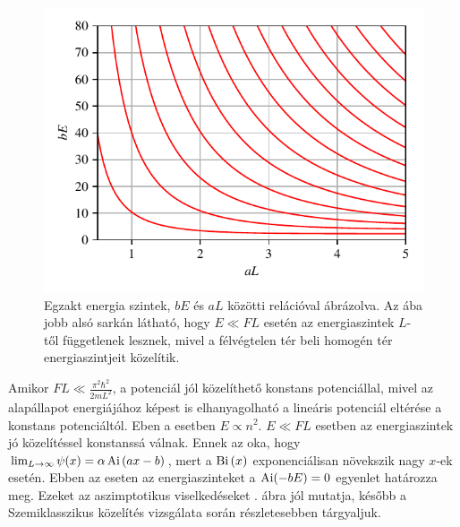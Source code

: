 \begin{figure}[H]
	\centering
	\includegraphics[scale=1]{./figs/energiaszintek.pdf}
	\caption[Egzakt energiaszintek]{Egzakt energia szintek, $bE$ és $aL$ közötti relációval ábrázolva. Az ába jobb alsó sarkán látható, hogy $E \ll FL$ esetén az energiaszintek $L$-től függetlenek lesznek, mivel a félvégtelen tér beli homogén tér energiaszintjeit közelítik.}
	\label{box_energiaszintek_abra}
\end{figure}
Amikor $FL \ll \frac{\pi^2\hbar^2}{2mL^2}$, a potenciál jól közelíthető konstans potenciállal, mivel az alapállapot energiájához képest is elhanyagolható a lineáris potenciál eltérése a konstans potenciáltól. Eben a esetben $E \propto n^2$. $E \ll FL$ esetben az energiaszintek jó közelítéssel konstanssá válnak. Ennek az oka, hogy $\lim_{L \to \infty}\psi(x) = \alpha \operatorname{Ai}\left(ax-b\right)$, mert a $\operatorname{Bi}\left(x\right)$ exponenciálisan növekszik nagy $x$-ek esetén. Ebben az eseten az energiaszinteket a $\operatorname{Ai}(-bE) = 0$ egyenlet határozza meg. Ezeket az aszimptotikus viselkedéseket . ábra jól mutatja, később a Szemiklasszikus közelítés vizsgálata során részletesebben tárgyaljuk.

